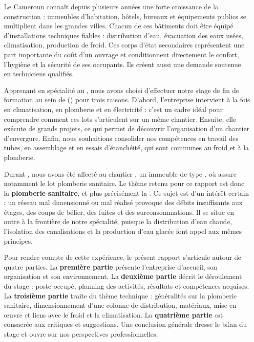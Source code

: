 
Le Cameroun connaît depuis plusieurs années une forte croissance de la construction : immeubles
d'habitation, hôtels, bureaux et équipements publics se multiplient dans les grandes villes.
Chacun de ces bâtiments doit être équipé d'installations techniques fiables : distribution
d'eau, évacuation des eaux usées, climatisation, production de froid. Ces corps d'état
secondaires représentent une part importante du coût d'un ouvrage et conditionnent directement
le confort, l'hygiène et la sécurité de ses occupants. Ils créent aussi une demande soutenue en
techniciens qualifiés.

Apprenant en spécialité \textbf{\InfoSpecialite} au \InfoCFP, nous avons choisi d'effectuer
notre stage de fin de formation au sein de \InfoEntreprise{} (\InfoEntrepriseSigle) pour trois
raisons. D'abord, l'entreprise intervient à la fois en climatisation, en plomberie et en
électricité : c'est un cadre idéal pour comprendre comment ces lots s'articulent sur un même
chantier. Ensuite, elle exécute de grands projets, ce qui permet de découvrir l'organisation
d'un chantier d'envergure. Enfin, nous souhaitions consolider nos compétences en travail des
tubes, en assemblage et en essais d'étanchéité, qui sont communes au froid et à la plomberie.

Durant \InfoDuree, nous avons été affecté au chantier \InfoChantier, un immeuble de type
\InfoChantierNiveaux, où \InfoEntrepriseSigle{} assure notamment le lot plomberie sanitaire.
Le thème retenu pour ce rapport est donc la \textbf{plomberie sanitaire}, et plus précisément
la \emph{\MakeLowercase{\InfoSousTheme}}. Ce sujet est d'un intérêt certain : un réseau mal
dimensionné ou mal réalisé provoque des débits insuffisants aux étages, des coups de bélier,
des fuites et des surconsommations. Il se situe en outre à la frontière de notre spécialité,
puisque la distribution d'eau chaude, l'isolation des canalisations et la production d'eau
glacée font appel aux mêmes principes.

Pour rendre compte de cette expérience, le présent rapport s'articule autour de quatre parties.
La \textbf{première partie} présente l'entreprise d'accueil, son organisation et son
environnement. La \textbf{deuxième partie} décrit le déroulement du stage : poste occupé,
planning des activités, résultats et compétences acquises. La \textbf{troisième partie} traite
du thème technique : généralités sur la plomberie sanitaire, dimensionnement d'une colonne de
distribution, matériaux, mise en œuvre et liens avec le froid et la climatisation. La
\textbf{quatrième partie} est consacrée aux critiques et suggestions. Une conclusion générale
dresse le bilan du stage et ouvre sur nos perspectives professionnelles.
